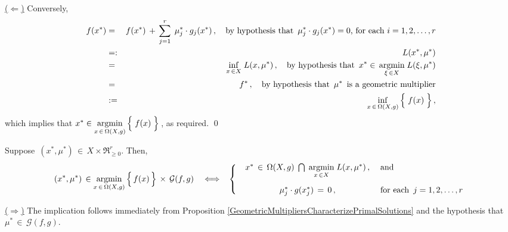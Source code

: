\vskip 0.3cm
\noindent
\underline{($\Longleftarrow$)}
\quad
Conversely,
\begin{eqnarray*}
f(x^{*})
& = &
	f(x^{*}) \,+\, \overset{r}{\underset{j=1}{\sum}}\;\,\mu_{j}^{*} \cdot g_{j}(x^{*})\,,
	\quad\textnormal{by hypothesis that \,$\mu_{j}^{*}\cdot g_{j}(x^{*}) = 0$, for each $i = 1,2,\ldots,r$}
\\
& =: &
	L(x^{*},\mu^{*})
\\
& = &
	\underset{x\,\in X}{\inf}\;L(x,\mu^{*})\,,
	\quad\textnormal{by hypothesis that \,$x^{*} \in\, \underset{\xi\,\in X}{\argmin}\;L(\xi,\mu^{*})$}
\\
& = &
	f^{*}\,,
	\quad\textnormal{by hypothesis that \,$\mu^{*}$\, is a geometric multiplier}
\\
& := &
	\underset{x\,\in\,\Omega(X,g)}{\inf}\left\{\;
		\overset{{\color{white}.}}{f(x)}
		\;\right\},
\end{eqnarray*}
which implies that
$x^{*} \in \underset{x\,\in\,\Omega(X,g)}{\argmin}\left\{\;\overset{{\color{white}.}}{f(x)}\;\right\}$\,,
as required.
\qed


\vskip 1.0cm
\begin{theorem}
\mbox{}
\vskip 0.1cm
\noindent
Suppose \,$(x^{*},\mu^{*}) \,\in\, X \times \Re_{\geq 0}^{r}$.
Then,
\begin{equation*}
(x^{*},\mu^{*})
	\,\in
	\underset{x\,\in\,\Omega(X,g)}{\argmin}\left\{\,\overset{{\color{white}.}}{f}(x)\,\right\}
	\,\times\,
	\mathcal{G}(f,g)
\quad\Longleftrightarrow\;\;\;
	\left\{\;\;\begin{array}{cl}
		x^{*} \,\in\,\Omega(X,g)\;\bigcap\;\underset{x\,\in X}{\argmin}\;L(x,\mu^{*})\,, & \;\textnormal{and}
		\\
		\overset{{\color{white}\textnormal{\large1}}}{\mu_{j}^{*}} \cdot g(x_{j}^{*}) \,=\, 0\,, & \;\textnormal{for each \,$j = 1,2,\ldots,r$}
		\end{array}\right.
\end{equation*}
\end{theorem}
\proof
\mbox{}
\vskip 0.1cm
\noindent
\underline{($\Longrightarrow$)}
\quad
The implication follows immediately from Proposition \ref{GeometricMultipliersCharacterizePrimalSolutions}
and the hypothesis that \,$\mu^{*} \,\in\, \mathcal{G}(f,g)$.

